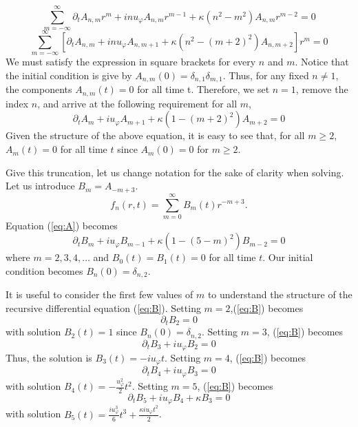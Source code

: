 \begin{equation}
\sum_{m=-\infty}^{\infty}\partial_{t}A_{n,m}r^{m} + inu_{\varphi}A_{n,m}r^{m-1} +  \kappa  (n^2 -m^2) A_{n,m} r^{m-2}  = 0
\end{equation}
\begin{equation}
\sum_{m=-\infty}^{\infty}\left[\partial_{t}A_{n,m} +  inu_{\varphi}A_{n,m+1}+  \kappa  (n^2 -(m+2)^2) A_{n,m+2} \right ] r^{m}  = 0
\end{equation}
We must satisfy the expression in square brackets for every $n$ and $m$. Notice that the initial condition is give by $A_{n,m}(0)=\delta_{n,1}\delta_{m,1}$. Thus, for any fixed $n\neq 1$, the components $A_{n,m}(t)=0$ for all time t. Therefore, we set $n=1$, remove the index $n$, and arrive at the following requirement for all $m$,
\begin{equation}
\label{eq:A}
\partial_{t}A_{m} +  iu_{\varphi}A_{m+1}+  \kappa  (1 -(m+2)^2) A_{m+2}   = 0
\end{equation}
Given the structure of the above equation, it is easy to see that, for all $m\geq 2$, $A_{m}(t)=0$ for all time $t$ since   $A_{m}(0)=0$ for $m\geq 2$. 

Give this truncation, let us change notation for the sake of clarity when solving.  Let us introduce $B_{m}=A_{-m+3}$.
\begin{equation}
\label{eq:Bexpansion}
f_{n}(r,t)=\sum_{m=0}^{\infty}B_{m}(t)r^{-m+3}.
\end{equation}
Equation (\ref{eq:A}) becomes
\begin{equation}
\label{eq:B}
\partial_{t}B_{m} +  iu_{\varphi}B_{m-1}+  \kappa  (1 -(5-m)^2) B_{m-2}   = 0 
\end{equation}
where $m=2,3,4, \dots$ and $B_{0}(t)=B_{1}(t)=0$ for all time $t$. Our initial condition becomes $B_{n}(0)=\delta_{n,2}$. 


It is useful to consider the first few values of $m$ to understand the structure of the recursive differential equation (\ref{eq:B}). Setting $m=2$,(\ref{eq:B}) becomes
\begin{equation}
\partial_{t}B_{2}   = 0
\end{equation}
with solution $B_{2}(t)=1$ since $B_{n}(0)=\delta_{n,2}$.
Setting $m=3$, (\ref{eq:B}) becomes
\begin{equation}
\partial_{t}B_{3} +  iu_{\varphi}B_{2}  = 0
\end{equation}
Thus, the solution is $B_{3}(t)=-iu_{\varphi}t$. Setting $m=4$, (\ref{eq:B}) becomes
\begin{equation}
\partial_{t}B_{4} +  iu_{\varphi}B_{3} = 0
\end{equation}
with solution $B_{4}(t)=-\frac{u_{\varphi}^2}{2}t^2$. Setting $m=5$, (\ref{eq:B}) becomes
\begin{equation}
\partial_{t}B_{5} +  iu_{\varphi}B_{4}+  \kappa  B_{3}   = 0
\end{equation}
with solution $B_{5}(t)= \frac{iu_{\varphi}^3}{6}t^3 +  \frac{\kappa iu_{\varphi}t^2}{2}$. 

